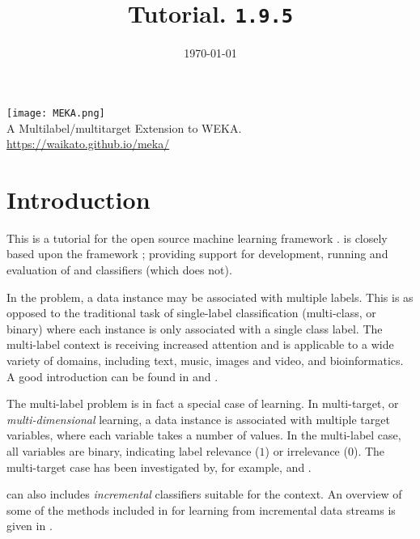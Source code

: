 \documentclass[11pt]{article}
\newcommand{\MEKA}{Meka}
\newcommand{\WEKA}{Weka}
\def\version{{\tt 1.9.5}}
\begin{document}
\title{Tutorial. \framework{\MEKA} \version }


\date{\mydate\today}

\maketitle

\begin{center}
	\texttt{[image: MEKA.png]}\\
		A Multilabel/multitarget Extension to WEKA.\\
		\url{https://waikato.github.io/meka/}
\end{center}

\tableofcontents

\thispagestyle{empty}
\pagebreak

\section{Introduction}

This is a tutorial for the open source machine learning framework \framework{\MEKA}. \framework{\MEKA} is closely based upon the \framework{\WEKA} framework \cite{WEKA}; providing support for development, running and evaluation of  and  classifiers (which  does not).

In the  problem, a data instance may be associated with multiple labels. This is as opposed to the traditional task of single-label classification (\ie multi-class, or binary) where each instance is only associated with a single class label. The multi-label context is receiving increased attention and is applicable to a wide variety of domains, including text, music, images and video, and bioinformatics. A good introduction can be found in \cite{MMD} and \cite{Thesis}.

The multi-label problem is in fact a special case of  learning. In multi-target, or \textit{multi-dimensional} learning, a data instance is associated with multiple target variables, where each variable takes a number of values. In the multi-label case, all variables are binary, indicating label relevance ($1$) or irrelevance ($0$). The multi-target case has been investigated by, for example, \cite{UPM} and \cite{MT}.  

\framework{\MEKA} can also includes \emph{incremental} classifiers suitable for the  context. An overview of some of the methods included in \framework{\MEKA} for learning from incremental data streams is given in \cite{MEDS2}.
\end{document}
